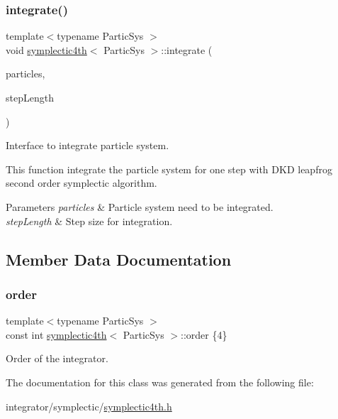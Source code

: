 \subsubsection{\texorpdfstring{integrate()}{integrate()}}
{\footnotesize\ttfamily template$<$typename Partic\+Sys $>$ \\
void \mbox{\hyperlink{classsymplectic4th}{symplectic4th}}$<$ Partic\+Sys $>$\+::integrate (\begin{DoxyParamCaption}\item[{Partic\+Sys \&}]{particles,  }\item[{\mbox{\hyperlink{classsymplectic4th_a272a5a2bb16a90a7ebdad0335a2fac9b}{Scalar}}}]{step\+Length }\end{DoxyParamCaption})}



Interface to integrate particle system. 

This function integrate the particle system for one step with D\+KD leapfrog second order symplectic algorithm. 
\begin{DoxyParams}{Parameters}
{\em particles} & Particle system need to be integrated. \\
\hline
{\em step\+Length} & Step size for integration. \\
\hline
\end{DoxyParams}


\subsection{Member Data Documentation}
\mbox{\label{classsymplectic4th_a44427b7e9dab1a2241071d1cc639ebe4}} 
\subsubsection{\texorpdfstring{order}{order}}
{\footnotesize\ttfamily template$<$typename Partic\+Sys $>$ \\
const int \mbox{\hyperlink{classsymplectic4th}{symplectic4th}}$<$ Partic\+Sys $>$\+::order \{4\}\hspace{0.3cm}{\ttfamily [static]}}



Order of the integrator. 



The documentation for this class was generated from the following file\+:\begin{DoxyCompactItemize}
\item 
integrator/symplectic/\mbox{\hyperlink{symplectic4th_8h}{symplectic4th.\+h}}\end{DoxyCompactItemize}
